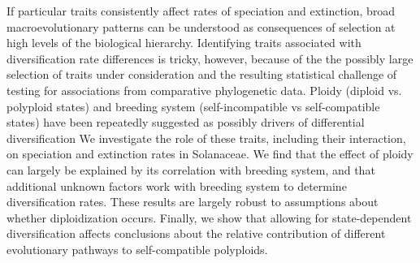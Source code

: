 If particular traits consistently affect rates of speciation and extinction, broad macroevolutionary patterns can be understood as consequences of selection at high levels of the biological hierarchy.
Identifying traits associated with diversification rate differences is tricky, however, because of the the possibly large selection of traits under consideration and the resulting statistical challenge of testing for associations from comparative phylogenetic data.
Ploidy (diploid vs. polyploid states) and breeding system (self-incompatible vs self-compatible states) have been repeatedly suggested as possibly drivers of differential diversification
We investigate the role of these traits, including their interaction, on speciation and extinction rates in Solanaceae.
We find that the effect of ploidy can largely be explained by its correlation with breeding system, and that additional unknown factors work with breeding system to determine diversification rates.
These results are largely robust to assumptions about whether diploidization occurs.
Finally, we show that allowing for state-dependent diversification affects conclusions about the relative contribution of different evolutionary pathways to self-compatible polyploids.
